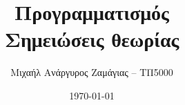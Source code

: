 \documentclass{extreport}
\begin{document}
\title{Προγραμματισμός\\Σημειώσεις θεωρίας}
\author{Μιχαήλ Ανάργυρος Ζαμάγιας -- ΤΠ5000}
\date{\today}

\maketitle

\newpage

\tableofcontents

\newpage
\end{document}
